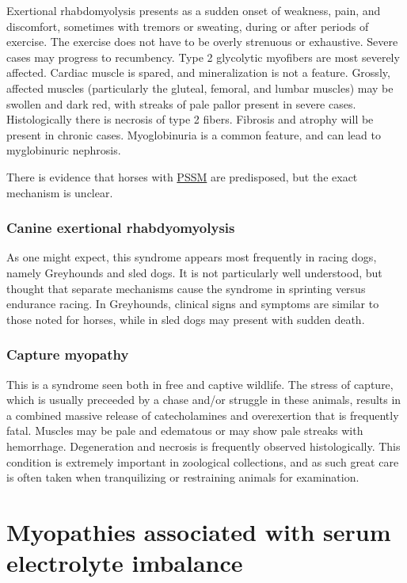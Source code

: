 \documentclass[openany]{book}
\begin{document}
Exertional rhabdomyolysis presents as a sudden onset of weakness, pain,
and discomfort, sometimes with tremors or sweating, during or after
periods of exercise. The exercise does not have to be overly strenuous
or exhaustive. Severe cases may progress to recumbency. Type 2
glycolytic myofibers are most severely affected. Cardiac muscle is
spared, and mineralization is not a feature. Grossly, affected muscles
(particularly the gluteal, femoral, and lumbar muscles) may be swollen
and dark red, with streaks of pale pallor present in severe cases.
Histologically there is necrosis of type 2 fibers. Fibrosis and atrophy
will be present in chronic cases. Myoglobinuria is a common feature, and
can lead to myglobinuric nephrosis.

There is evidence that horses with
\protect\hyperlink{equine-polysaccharide-storage-myopathy-pssm}{PSSM}
are predisposed, but the exact mechanism is unclear.

\subsection{Canine exertional
rhabdyomyolysis}\label{canine-exertional-rhabdyomyolysis}

As one might expect, this syndrome appears most frequently in racing
dogs, namely Greyhounds and sled dogs. It is not particularly well
understood, but thought that separate mechanisms cause the syndrome in
sprinting versus endurance racing. In Greyhounds, clinical signs and
symptoms are similar to those noted for horses, while in sled dogs may
present with sudden death.

\subsection{Capture myopathy}\label{capture-myopathy}

This is a syndrome seen both in free and captive wildlife. The stress of
capture, which is usually preceeded by a chase and/or struggle in these
animals, results in a combined massive release of catecholamines and
overexertion that is frequently fatal. Muscles may be pale and edematous
or may show pale streaks with hemorrhage. Degeneration and necrosis is
frequently observed histologically. This condition is extremely
important in zoological collections, and as such great care is often
taken when tranquilizing or restraining animals for examination.

\chapter{Myopathies associated with serum electrolyte
imbalance}\label{myopathies-associated-with-serum-electrolyte-imbalance}
\end{document}
